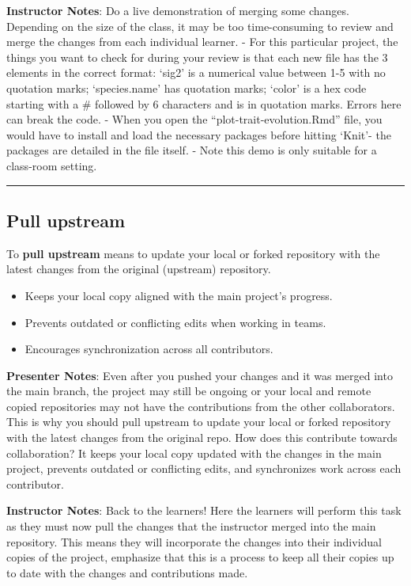 \documentclass[
  letterpaper,
  DIV=11,
  numbers=noendperiod]{scrartcl}
\providecommand{\tightlist}{%
  \setlength{\itemsep}{0pt}\setlength{\parskip}{0pt}}
\begin{document}
\textbf{Instructor Notes}: Do a live demonstration of merging some
changes. Depending on the size of the class, it may be too
time-consuming to review and merge the changes from each individual
learner. - For this particular project, the things you want to check for
during your review is that each new file has the 3 elements in the
correct format: `sig2' is a numerical value between 1-5 with no
quotation marks; `species.name' has quotation marks; `color' is a hex
code starting with a \# followed by 6 characters and is in quotation
marks. Errors here can break the code. - When you open the
``plot-trait-evolution.Rmd'' file, you would have to install and load
the necessary packages before hitting `Knit'- the packages are detailed
in the file itself. - Note this demo is only suitable for a class-room
setting.

\begin{center}\rule{0.5\linewidth}{0.5pt}\end{center}

\subsection{Pull upstream}\label{pull-upstream}

To \textbf{pull upstream} means to update your local or forked
repository with the latest changes from the original (upstream)
repository.

\begin{itemize}
\tightlist
\item
  Keeps your local copy aligned with the main project's progress.
\item
  Prevents outdated or conflicting edits when working in teams.
\item
  Encourages synchronization across all contributors.
\end{itemize}

\textbf{Presenter Notes}: Even after you pushed your changes and it was
merged into the main branch, the project may still be ongoing or your
local and remote copied repositories may not have the contributions from
the other collaborators. This is why you should pull upstream to update
your local or forked repository with the latest changes from the
original repo. How does this contribute towards collaboration? It keeps
your local copy updated with the changes in the main project, prevents
outdated or conflicting edits, and synchronizes work across each
contributor.

\textbf{Instructor Notes}: Back to the learners! Here the learners will
perform this task as they must now pull the changes that the instructor
merged into the main repository. This means they will incorporate the
changes into their individual copies of the project, emphasize that this
is a process to keep all their copies up to date with the changes and
contributions made.
\end{document}
